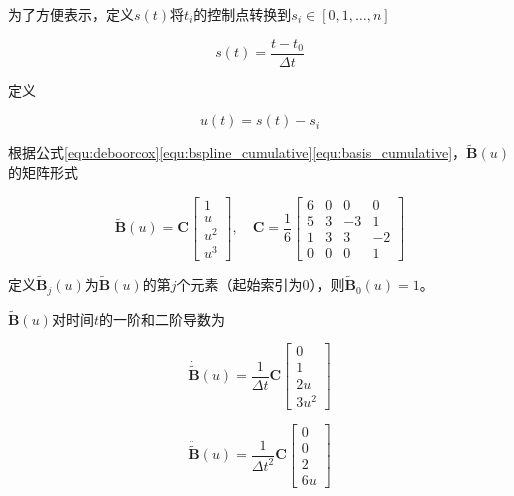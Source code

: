 \documentclass[12pt,a4paper]{article}
\begin{document}
为了方便表示，定义$s(t)$将$t_i$的控制点转换到$s_i \in [0,1,\dots,n]$

\begin{equation}
s(t)=\frac{t-t_0}{\Delta t}
\end{equation}

定义

\begin{equation}
u(t)=s(t)-s_i
\end{equation}

根据公式\eqref{equ:deboorcox}\eqref{equ:bspline_cumulative}\eqref{equ:basis_cumulative}，$\tilde{\mathbf{B}}(u)$的矩阵形式

\begin{equation}\label{equ:basis_cumulative_matrix}
\tilde{\mathbf{B}}(u) = \mathbf{C} 
\begin{bmatrix}
1 \\ u \\ u^2 \\ u^3
\end{bmatrix}, \quad
\mathbf{C} = \frac{1}{6}
\begin{bmatrix}
6 & 0 &  0 &  0 \\
5 & 3 & -3 &  1 \\
1 & 3 &  3 & -2 \\
0 & 0 &  0 &  1
\end{bmatrix}
\end{equation}

定义$\tilde{\mathbf{B}}_j(u)$为$\tilde{\mathbf{B}}(u)$的第$j$个元素（起始索引为$0$），则$\tilde{\mathbf{B}}_0(u)=1$。

$\tilde{\mathbf{B}}(u)$对时间$t$的一阶和二阶导数为

\begin{equation}
\dot{\tilde{\mathbf{B}}}(u) = \frac{1}{\Delta t} \mathbf{C}
\begin{bmatrix}
0 \\ 1 \\ 2u \\ 3u^2
\end{bmatrix}
\end{equation}

\begin{equation}
\ddot{\tilde{\mathbf{B}}}(u) = \frac{1}{{\Delta t}^2} \mathbf{C}
\begin{bmatrix}
0 \\ 0 \\ 2 \\ 6u
\end{bmatrix}
\end{equation}
\end{document}
